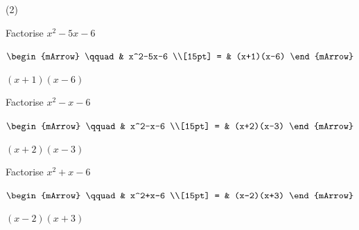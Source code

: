 \begin{mtask}(2)
   \task \begin{exercise} Factorise $x^2-5x-6$\\
            \begin{envSolution}[equal height group=hRevF1]
                  $\begin{mArrow}
                       \qquad   & x^2-5x-6 \\[15pt]
	                          = & (x+1)(x-6) 
					\end{mArrow}$
                 \begin{shortsolution}  
				       $(x+1)(x-6)$
			     \end{shortsolution}				 
               \end{envSolution}
         \end{exercise}
   \task \begin{exercise} Factorise $x^2-x-6$\\
            \begin{envSolution}[equal height group=hRevF1]
                  $\begin{mArrow}
                       \qquad   & x^2-x-6 \\[15pt]
	                          = & (x+2)(x-3)    
					\end{mArrow}$
                 \begin{shortsolution}  
				       $(x+2)(x-3)$
			     \end{shortsolution}				 
               \end{envSolution}
         \end{exercise}

   \task \begin{exercise} Factorise $x^2+x-6$\\
            \begin{envSolution}[equal height group=hRevF1]
                  $\begin{mArrow}
                       \qquad  & x^2+x-6 \\[15pt]
	                         = & (x-2)(x+3) 
					\end{mArrow}$
                 \begin{shortsolution}  
				       $(x-2)(x+3)$
			     \end{shortsolution}				 
               \end{envSolution}
         \end{exercise}
		 

\end{mtask}
